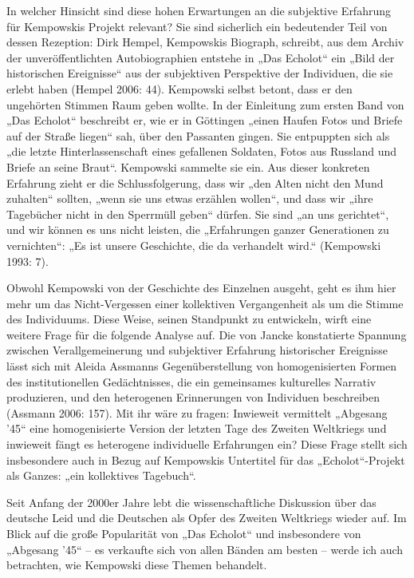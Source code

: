 \begin{multicols*}{2}
In welcher Hinsicht sind diese hohen Erwartungen an die subjektive Erfahrung für Kempowskis Projekt relevant? Sie sind sicherlich ein bedeutender Teil von dessen Rezeption: Dirk Hempel, Kempowskis Biograph, schreibt, aus dem Archiv der unveröffentlichten Autobiographien entstehe in „Das Echolot“ ein „Bild der historischen Ereignisse“ aus der subjektiven Perspektive der Individuen, die sie erlebt haben (Hempel 2006: 44). Kempowski selbst betont, dass er den ungehörten Stimmen Raum geben wollte. In der Einleitung zum ersten Band von „Das Echolot“ beschreibt er, wie er in Göttingen „einen Haufen Fotos und Briefe auf der Straße liegen“ sah, über den Passanten gingen. Sie entpuppten sich als „die letzte Hinterlassenschaft eines gefallenen Soldaten, Fotos aus Russland und Briefe an seine Braut“. Kempowski sammelte sie ein. Aus dieser konkreten Erfahrung zieht er die Schlussfolgerung, dass wir „den Alten nicht den Mund zuhalten“ sollten, „wenn sie uns etwas erzählen wollen“, und dass wir „ihre Tagebücher nicht in den Sperrmüll geben“ dürfen. Sie sind „an uns gerichtet“, und wir können es uns nicht leisten, die „Erfahrungen ganzer Generationen zu vernichten“: „Es ist unsere Geschichte, die da verhandelt wird.“ (Kempowski 1993: 7).

Obwohl Kempowski von der Geschichte des Einzelnen ausgeht, geht es ihm hier mehr um das Nicht-Vergessen einer kollektiven Vergangenheit als um die Stimme des Individuums. Diese Weise, seinen Standpunkt zu entwickeln, wirft eine weitere Frage für die folgende Analyse auf. Die von Jancke konstatierte Spannung zwischen Verallgemeinerung und subjektiver Erfahrung historischer Ereignisse lässt sich mit Aleida Assmanns Gegenüberstellung von homogenisierten Formen des institutionellen Gedächtnisses, die ein gemeinsames kulturelles Narrativ produzieren, und den heterogenen Erinnerungen von Individuen beschreiben (Assmann 2006: 157). Mit ihr wäre zu fragen: Inwieweit vermittelt „Abgesang ’45“ eine homogenisierte Version der letzten Tage des Zweiten Weltkriegs und inwieweit fängt es heterogene individuelle Erfahrungen ein? Diese Frage stellt sich insbesondere auch in Bezug auf Kempowskis Untertitel für das „Echolot“-Projekt als Ganzes: „ein kollektives Tagebuch“.

Seit Anfang der 2000er Jahre lebt die wissenschaftliche Diskussion über das deutsche Leid und die Deutschen als Opfer des Zweiten Weltkriegs wieder auf. Im Blick auf die große Popularität von „Das Echolot“ und insbesondere von „Abgesang ’45“ – es verkaufte sich von allen Bänden am besten – werde ich auch betrachten, wie Kempowski diese Themen behandelt.


\end{multicols*}
